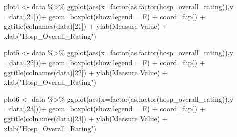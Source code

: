 \documentclass[
]{article}
\newenvironment{Shaded}{\begin{snugshade}}{\end{snugshade}}
\newcommand{\AttributeTok}[1]{\textcolor[rgb]{0.77,0.63,0.00}{#1}}
\newcommand{\DecValTok}[1]{\textcolor[rgb]{0.00,0.00,0.81}{#1}}
\newcommand{\FunctionTok}[1]{\textcolor[rgb]{0.00,0.00,0.00}{#1}}
\newcommand{\NormalTok}[1]{#1}
\newcommand{\OtherTok}[1]{\textcolor[rgb]{0.56,0.35,0.01}{#1}}
\newcommand{\SpecialCharTok}[1]{\textcolor[rgb]{0.00,0.00,0.00}{#1}}
\newcommand{\StringTok}[1]{\textcolor[rgb]{0.31,0.60,0.02}{#1}}
\begin{document}
\begin{Shaded}
\begin{Highlighting}[]
\NormalTok{plot4 }\OtherTok{\textless{}{-}}\NormalTok{ data }\SpecialCharTok{\%\textgreater{}\%} \FunctionTok{ggplot}\NormalTok{(}\FunctionTok{aes}\NormalTok{(}\AttributeTok{x=}\FunctionTok{factor}\NormalTok{(}\FunctionTok{as.factor}\NormalTok{(hosp\_overall\_rating)),}\AttributeTok{y =}\NormalTok{data[,}\DecValTok{21}\NormalTok{]))}\SpecialCharTok{+}
  \FunctionTok{geom\_boxplot}\NormalTok{(}\AttributeTok{show.legend =}\NormalTok{ F) }\SpecialCharTok{+}
  \FunctionTok{coord\_flip}\NormalTok{() }\SpecialCharTok{+}
  \FunctionTok{ggtitle}\NormalTok{(}\FunctionTok{colnames}\NormalTok{(data)[}\DecValTok{21}\NormalTok{]) }\SpecialCharTok{+} 
  \FunctionTok{ylab}\NormalTok{(}\StringTok{\textquotesingle{}Measure Value\textquotesingle{}}\NormalTok{) }\SpecialCharTok{+} \FunctionTok{xlab}\NormalTok{(}\StringTok{"Hosp\_Overall\_Rating"}\NormalTok{)}

\NormalTok{plot5 }\OtherTok{\textless{}{-}}\NormalTok{ data }\SpecialCharTok{\%\textgreater{}\%} \FunctionTok{ggplot}\NormalTok{(}\FunctionTok{aes}\NormalTok{(}\AttributeTok{x=}\FunctionTok{factor}\NormalTok{(}\FunctionTok{as.factor}\NormalTok{(hosp\_overall\_rating)),}\AttributeTok{y =}\NormalTok{data[,}\DecValTok{22}\NormalTok{]))}\SpecialCharTok{+}
  \FunctionTok{geom\_boxplot}\NormalTok{(}\AttributeTok{show.legend =}\NormalTok{ F) }\SpecialCharTok{+}
  \FunctionTok{coord\_flip}\NormalTok{() }\SpecialCharTok{+}
  \FunctionTok{ggtitle}\NormalTok{(}\FunctionTok{colnames}\NormalTok{(data)[}\DecValTok{22}\NormalTok{]) }\SpecialCharTok{+} 
  \FunctionTok{ylab}\NormalTok{(}\StringTok{\textquotesingle{}Measure Value\textquotesingle{}}\NormalTok{) }\SpecialCharTok{+} \FunctionTok{xlab}\NormalTok{(}\StringTok{"Hosp\_Overall\_Rating"}\NormalTok{)}

\NormalTok{plot6 }\OtherTok{\textless{}{-}}\NormalTok{ data }\SpecialCharTok{\%\textgreater{}\%} \FunctionTok{ggplot}\NormalTok{(}\FunctionTok{aes}\NormalTok{(}\AttributeTok{x=}\FunctionTok{factor}\NormalTok{(}\FunctionTok{as.factor}\NormalTok{(hosp\_overall\_rating)),}\AttributeTok{y =}\NormalTok{data[,}\DecValTok{23}\NormalTok{]))}\SpecialCharTok{+}
  \FunctionTok{geom\_boxplot}\NormalTok{(}\AttributeTok{show.legend =}\NormalTok{ F) }\SpecialCharTok{+}
  \FunctionTok{coord\_flip}\NormalTok{() }\SpecialCharTok{+}
  \FunctionTok{ggtitle}\NormalTok{(}\FunctionTok{colnames}\NormalTok{(data)[}\DecValTok{23}\NormalTok{]) }\SpecialCharTok{+} 
  \FunctionTok{ylab}\NormalTok{(}\StringTok{\textquotesingle{}Measure Value\textquotesingle{}}\NormalTok{) }\SpecialCharTok{+} \FunctionTok{xlab}\NormalTok{(}\StringTok{"Hosp\_Overall\_Rating"}\NormalTok{)}


\end{Highlighting}
\end{Shaded}
\end{document}

